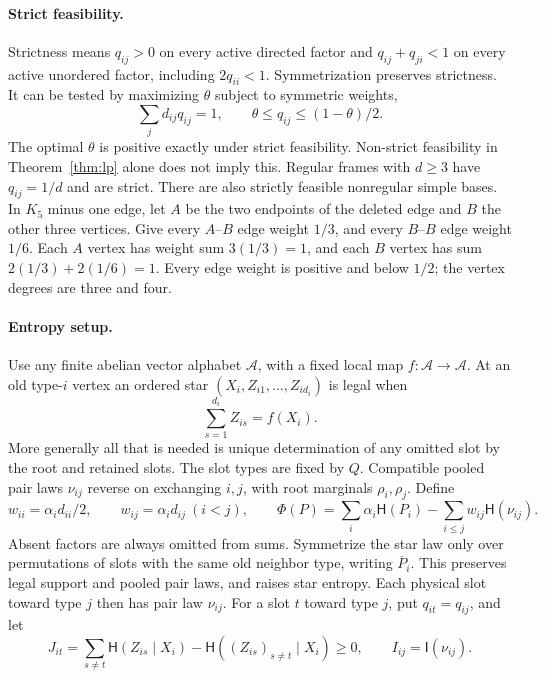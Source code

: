 \documentclass[11pt]{article}
\newcommand{\HH}{\mathsf H}
\newcommand{\II}{\mathsf I}
\begin{document}
\paragraph{Strict feasibility.}
Strictness means $q_{ij}>0$ on every active directed factor and
$q_{ij}+q_{ji}<1$ on every active unordered factor, including
$2q_{ii}<1$. Symmetrization preserves strictness. It can be tested by
maximizing $\theta$ subject to symmetric weights,
\[
 \sum_jd_{ij}q_{ij}=1,\qquad
 \theta\leq q_{ij}\leq(1-\theta)/2.                 \tag{6}
\]
The optimal $\theta$ is positive exactly under strict feasibility.
Non-strict feasibility in Theorem~\ref{thm:lp} alone does not imply
this. Regular frames with $d\geq3$ have $q_{ij}=1/d$ and are strict.
There are also strictly feasible nonregular simple bases. In
$K_5$ minus one edge, let $A$ be the two endpoints of the deleted
edge and $B$ the other three vertices. Give every $A$--$B$ edge
weight $1/3$, and every $B$--$B$ edge weight $1/6$. Each $A$ vertex
has weight sum $3(1/3)=1$, and each $B$ vertex has sum
$2(1/3)+2(1/6)=1$. Every edge weight is positive and below $1/2$;
the vertex degrees are three and four.

\paragraph{Entropy setup.}
Use any finite abelian vector alphabet $\mathcal A$, with a fixed local
map $f:\mathcal A\to\mathcal A$. At an old type-$i$ vertex an ordered
star $(X_i,Z_{i1},\ldots,Z_{id_i})$ is legal when
\[
 \sum_{s=1}^{d_i} Z_{is}=f(X_i).                    \tag{7}
\]
More generally all that is needed is unique determination of any
omitted slot by the root and retained slots. The slot types are fixed
by $Q$. Compatible pooled pair laws $\nu_{ij}$ reverse on exchanging
$i,j$, with root marginals $\rho_i,\rho_j$. Define
\[
 w_{ii}=\alpha_id_{ii}/2,\qquad w_{ij}=\alpha_id_{ij}\ (i<j),
 \qquad
 \Phi(P)=\sum_i\alpha_i\HH(P_i)-\sum_{i\leq j}w_{ij}\HH(\nu_{ij}).
                                                               \tag{8}
\]
Absent factors are always omitted from sums.
Symmetrize the star law only over permutations of slots with the same
old neighbor type, writing $\overline P_i$. This preserves legal
support and pooled pair laws, and raises star entropy. Each physical
slot toward type $j$ then has pair law $\nu_{ij}$.
For a slot $t$ toward type $j$, put $q_{it}=q_{ij}$, and let
\[
 J_{it}=\sum_{s\ne t}\HH(Z_{is}\mid X_i)
              -\HH((Z_{is})_{s\ne t}\mid X_i)\geq0,
 \qquad I_{ij}=\II(\nu_{ij}).
\]
\end{document}
